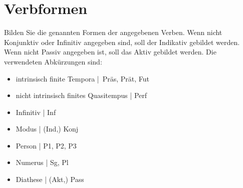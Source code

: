 \Zeile

\section{Verbformen}

Bilden Sie die genannten Formen der angegebenen Verben.
Wenn nicht Konjunktiv oder Infinitiv angegeben sind, soll der Indikativ gebildet werden.
Wenn nicht Passiv angegeben ist, soll das Aktiv gebildet werden.
Die verwendeten Abkürzungen sind:

\begin{itemize}\Lf
  \item intrinsisch finite Tempora | Präs, Prät, Fut
  \item nicht intrinsisch finites Quasitempus | Perf
  \item Infinitiv | Inf
  \item Modus | (Ind,) Konj
  \item Person | P1, P2, P3
  \item Numerus | Sg, Pl
  \item Diathese | (Akt,) Pass
\end{itemize}

\begin{center}
\end{center}

